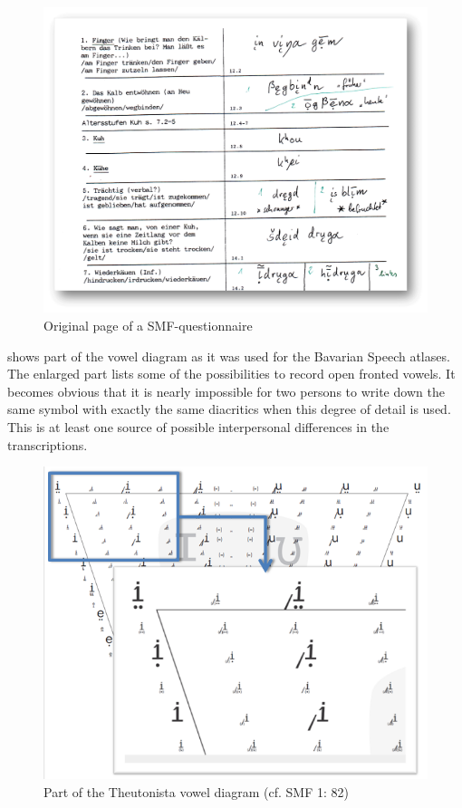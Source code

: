 \documentclass[output=paper]{LSP/langsci}
\begin{document}
\begin{figure}
\includegraphics[width=\textwidth]{illustrations/mathus_fig3}
\caption{Original page of a SMF-questionnaire}
\label{fig:3}
\end{figure}

 shows part of the vowel diagram as it was used for the Bavarian Speech atlases. The enlarged part lists some of the possibilities to record open fronted vowels. It becomes obvious that it is nearly impossible for two persons to write down the same symbol with exactly the same diacritics when this degree of detail is used. This is at least one source of possible interpersonal differences in the transcriptions.

\begin{figure}
\includegraphics[width=\textwidth]{illustrations/mathus_fig4}
\caption{Part of the Theutonista vowel diagram (cf. SMF 1: 82)}
\label{fig:4}
\end{figure}
\end{document}
